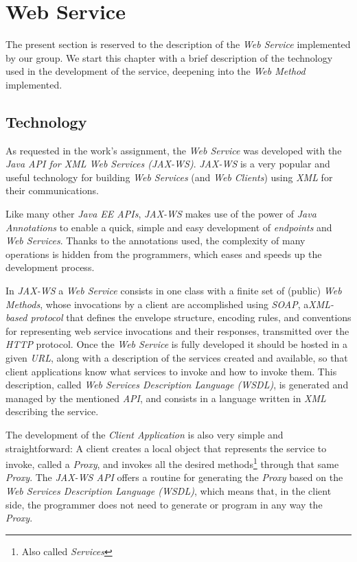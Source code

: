 \chapter{Web Service}
\label{web_service}

The present section is reserved to the description of the \emph{Web Service} implemented by our group. We start this chapter with a brief description of the technology used in the development of the service, deepening into the \emph{Web Method} implemented.

\section{Technology}

As requested in the work's assignment, the \emph{Web Service} was developed with the \emph{Java API for XML Web Services (JAX-WS)}. \emph{JAX-WS} is a very popular and useful technology for building \emph{Web Services} (and \emph{Web Clients}) using \emph{XML} for their communications.

Like many other \emph{Java EE APIs}, \emph{JAX-WS} makes use of the power of \emph{Java Annotations} to enable a quick, simple and easy development of \emph{endpoints} and \emph{Web Services}. Thanks to the annotations used, the complexity of many operations is hidden from the programmers, which eases and speeds up the development process.

In \emph{JAX-WS} a \emph{Web Service} consists in one class with a finite set of (public) \emph{Web Methods}, whose invocations by a client are accomplished using \emph{SOAP}, a\emph{XML-based protocol} that defines the envelope structure, encoding rules, and conventions for representing web service invocations and their responses, transmitted over the \emph{HTTP} protocol. Once the \emph{Web Service} is fully developed it should be hosted in a given \emph{URL}, along with a description of the services created and available, so that client applications know what services to invoke and how to invoke them. This description, called \emph{Web Services Description Language (WSDL)}, is generated and managed by the mentioned \emph{API}, and consists in a language written in \emph{XML} describing the service.

The development of the \emph{Client Application} is also very simple and straightforward: A client creates a local object that represents the service to invoke, called a \emph{Proxy}, and invokes all the desired methods\footnote{Also called \emph{Services}} through that same \emph{Proxy}. The \emph{JAX-WS API} offers a routine for generating the \emph{Proxy} based on the \emph{Web Services Description Language (WSDL)}, which means that, in the client side, the programmer does not need to generate or program in any way the \emph{Proxy}.

